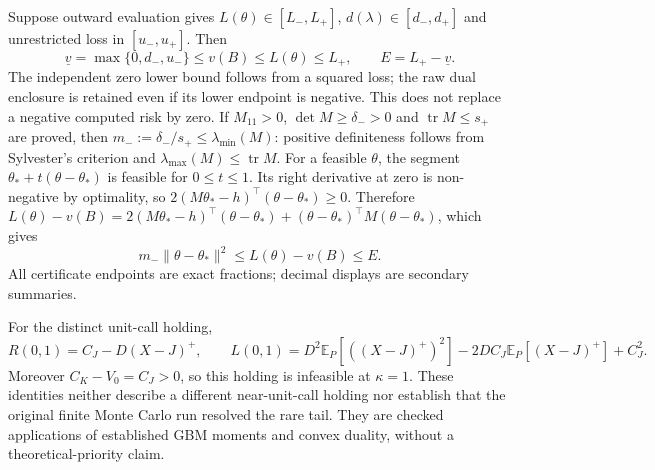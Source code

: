 \documentclass[11pt]{article}
\begin{document}
Suppose outward evaluation gives $L(\theta)\in[L_-,L_+]$,
$d(\lambda)\in[d_-,d_+]$ and unrestricted loss in $[u_-,u_+]$.
Then
\begin{equation}
 \underline v=\max\{0,d_-,u_-\}\leq v(B)\leq L(\theta)\leq L_+,
 \qquad E=L_+-\underline v.
 \label{eq:h-outward-value-gap}
\end{equation}
The independent zero lower bound follows from a squared loss; the raw
dual enclosure is retained even if its lower endpoint is negative.
This does not replace a negative computed risk by zero.
If $M_{11}>0$, $\det M\geq\delta_->0$ and
$\operatorname{tr}M\leq s_+$ are proved, then
$m_-:=\delta_-/s_+\leq\lambda_{\min}(M)$:
positive definiteness follows from Sylvester's criterion and
$\lambda_{\max}(M)\leq\operatorname{tr}M$.
For a feasible $\theta$, the segment
$\theta_*+t(\theta-\theta_*)$ is feasible for $0\leq t\leq1$.
Its right derivative at zero is non-negative by optimality, so
$2(M\theta_*-h)^\top(\theta-\theta_*)\geq0$. Therefore
$L(\theta)-v(B)=2(M\theta_*-h)^\top(\theta-\theta_*)
+(\theta-\theta_*)^\top M(\theta-\theta_*)$, which gives
\begin{equation}
 m_-\|\theta-\theta_*\|^2
 \leq L(\theta)-v(B)\leq E.
 \label{eq:h-outward-position-bound}
\end{equation}
All certificate endpoints are exact fractions; decimal displays are
secondary summaries.

For the distinct unit-call holding,
\begin{equation}
 R(0,1)=C_J-D(X-J)^+,\qquad
 L(0,1)=D^2\mathbb E_P[((X-J)^+)^2]
 -2DC_J\mathbb E_P[(X-J)^+]+C_J^2.
 \label{eq:h-unit-call-tail-risk}
\end{equation}
Moreover $C_K-V_0=C_J>0$, so this holding is infeasible at $\kappa=1$.
These identities neither describe a different near-unit-call holding nor
establish that the original finite Monte Carlo run resolved the rare tail.
They are checked applications of established GBM moments and convex
duality, without a theoretical-priority claim.
\end{document}
